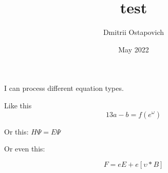 \documentclass{article}
\title{test}
\author{Dmitrii Ostapovich}
\date{May 2022}
\begin{document}
\maketitle

I can process different equation types.

Like this
$$13a - b = f(e^\omega)$$

Or this: $H\Psi = E\Psi$

Or even this:

\begin{equation}
    F = eE+e[\upsilon*B]
\end{equation}
\end{document}
